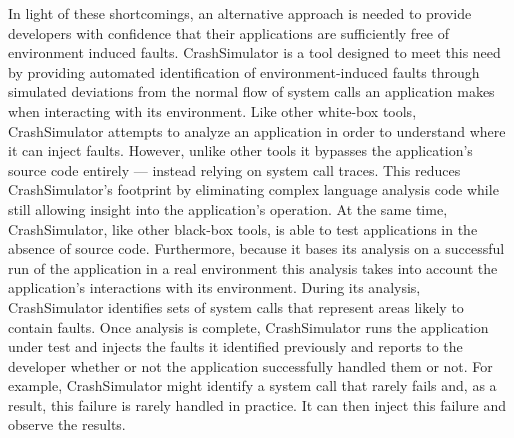     In light of these shortcomings, an alternative approach is needed to provide developers with confidence that their
    applications are sufficiently free of environment induced faults.  CrashSimulator is a tool designed to meet this
    need by providing automated identification of environment-induced faults through simulated deviations from the
    normal flow of system calls an application makes when interacting with its environment. Like other white-box tools,
    CrashSimulator attempts to analyze an application in order to understand where it can inject faults.  However,
    unlike other tools it bypasses the application's source code entirely --- instead relying on system call traces.
    This reduces CrashSimulator's footprint by eliminating complex language analysis code while still allowing insight
    into the application's operation. At the same time, CrashSimulator, like other black-box tools, is able to test
    applications in the absence of source code. Furthermore, because it bases its analysis on a successful run of the
    application in a real environment this analysis takes into account the application's interactions with its
    environment. During its analysis, CrashSimulator identifies sets of system calls that represent areas likely to
    contain faults. Once analysis is complete, CrashSimulator runs the application under test and injects the faults it
    identified previously and reports to the developer whether or not the application successfully handled them or not.
    For example, CrashSimulator might identify a system call that rarely fails and, as a result, this failure is rarely
    handled in practice. It can then inject this failure and observe the results.
